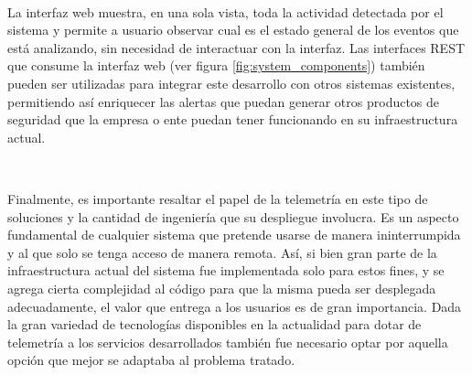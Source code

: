 \documentclass[a4paper,12pt, oneside]{article}
\begin{document}
\

La interfaz web muestra, en una sola vista, toda la actividad detectada por el sistema y permite a usuario observar cual es el estado 
general de los eventos que está analizando, sin necesidad de interactuar con la interfaz. Las interfaces REST que consume la interfaz web (ver figura \ref{fig:system_components}) también pueden ser utilizadas para integrar este desarrollo con otros sistemas existentes, permitiendo así enriquecer las alertas que puedan generar otros productos de seguridad que la empresa o ente puedan tener funcionando en su infraestructura actual.

\

Finalmente, es importante resaltar el papel de la telemetría en este tipo de soluciones y la cantidad de ingeniería que su despliegue involucra. Es un aspecto fundamental de cualquier sistema que pretende usarse de manera ininterrumpida y al que solo se tenga acceso de manera remota. Así, si bien gran parte de la infraestructura actual del sistema fue implementada solo para estos fines, y se agrega cierta complejidad al código para que la misma pueda ser desplegada adecuadamente, el valor que entrega a los usuarios es de gran importancia. Dada la gran variedad de tecnologías disponibles en la actualidad para dotar de telemetría a los servicios desarrollados también fue necesario optar por aquella opción que mejor se adaptaba al problema tratado.

\clearpage
\end{document}

